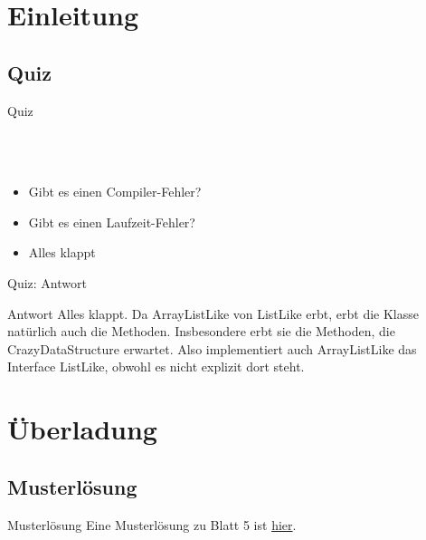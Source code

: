 \documentclass[usepdftitle=false,hyperref={pdfpagelabels=false}]{beamer}
\begin{document}
\title{\titleText}
\subtitle{Überladung, Bindung, List, Dictionarys}
\author{\tutor}
\date{\today}
\subject{Programmieren}

\frame{\titlepage}



\section{Einleitung}
\subsection{Quiz}
\begin{frame}{Quiz}
    \inputminted[linenos=true, numbersep=5pt, tabsize=4, fontsize=\tiny,frame=lines,label=Main.java]{java}{QuizMain.java}
    \inputminted[linenos=true, numbersep=5pt, tabsize=4, fontsize=\tiny]{java}{CrazyDataStructure.java}
    \inputminted[linenos=true, numbersep=5pt, tabsize=4, fontsize=\tiny]{java}{ListLike.java}
    \inputminted[linenos=true, numbersep=5pt, tabsize=4, fontsize=\tiny]{java}{ArrayListLike.java}
    \begin{itemize}
        \item Gibt es einen Compiler-Fehler?
        \item Gibt es einen Laufzeit-Fehler?
        \item Alles klappt
    \end{itemize}
\end{frame}

\begin{frame}{Quiz: Antwort}
    \begin{block}{Antwort}
        Alles klappt. Da ArrayListLike von ListLike erbt, erbt die
        Klasse natürlich auch die Methoden. Insbesondere erbt sie
        die Methoden, die CrazyDataStructure erwartet. Also
        implementiert auch ArrayListLike das Interface ListLike,
        obwohl es nicht explizit dort steht.
    \end{block}
\end{frame}

\section{Überladung}
\subsection{Musterlösung}
\begin{frame}{Musterlösung}
    Eine Musterlösung zu Blatt 5 ist
    \href{https://github.com/MartinThoma/prog-ws1213/tree/master/Blatt-05/tutor-solution/Blatt5/src/mediabib}{hier}.
\end{frame}
\end{document}
